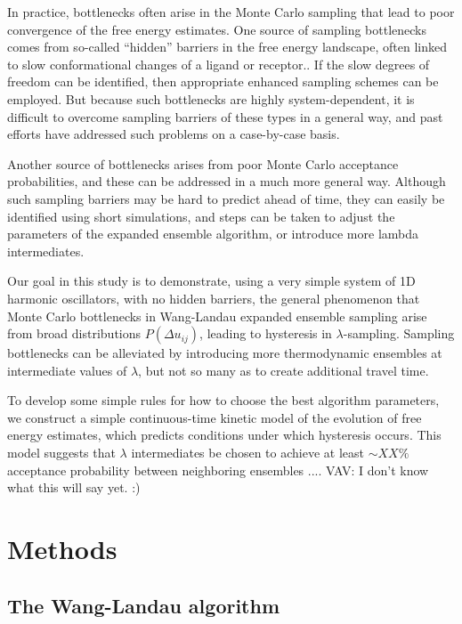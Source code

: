 \documentclass[%
 aip,
 rsi,
 jmp,%
 amsmath,amssymb,
 reprint,%
]{revtex4-1}
\begin{document}
In practice, bottlenecks often arise in the Monte Carlo sampling that lead to poor convergence of the free energy estimates.  One source of sampling bottlenecks comes from so-called ``hidden'' barriers in the free energy landscape, often linked to slow conformational changes of a ligand or receptor.\cite{slow-barriers}.  If the slow degrees of freedom can be identified, then appropriate enhanced sampling schemes can be employed.  But because such bottlenecks are highly system-dependent,  it is difficult to overcome sampling barriers of these types in a general way, and past efforts have addressed such problems on a case-by-case basis.\cite{case-by-case}

Another source of bottlenecks arises from poor Monte Carlo acceptance probabilities, and these can be addressed in a much more general way. Although such sampling barriers may be hard to predict ahead of time, they can easily be identified using short simulations, and steps can be taken to adjust the parameters of the expanded ensemble algorithm, or introduce more lambda intermediates.

Our goal in this study is to demonstrate, using a very simple system of 1D harmonic oscillators, with no hidden barriers, the general phenomenon that Monte Carlo bottlenecks in Wang-Landau expanded ensemble sampling arise from broad distributions $P(\Delta u_{ij})$, leading to hysteresis in $\lambda$-sampling.   Sampling bottlenecks can be alleviated by introducing more thermodynamic ensembles at intermediate values of $\lambda$, but not so many as to create additional travel time.

To develop some simple rules for how to choose the best algorithm parameters, we construct a simple continuous-time kinetic model of the evolution of free energy estimates, which predicts conditions under which hysteresis occurs.  \color{red} This model suggests that $\lambda$ intermediates be chosen to achieve at least $\sim XX\%$ acceptance probability between neighboring ensembles .... VAV:  I don't know what this will say yet. :) \color{black}

\section*{Methods}

\subsection{The Wang-Landau algorithm}
\end{document}
